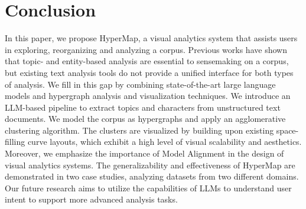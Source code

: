 \section{Conclusion}
In this paper, we propose HyperMap, a visual analytics system that assists users in exploring, reorganizing and analyzing a corpus.
Previous works have shown that topic- and entity-based analysis are essential to sensemaking on a corpus,
but existing text analysis tools do not provide a unified interface for both types of analysis.
We fill in this gap by combining state-of-the-art large language models and hypergraph analysis and visualization techniques.
We introduce an LLM-based pipeline to extract topics and characters from unstructured text documents.
We model the corpus as hypergraphs and apply an agglomerative clustering algorithm.
The clusters are visualized by building upon existing space-filling curve layouts, which exhibit a high level of visual scalability and aesthetics.
Moreover, we emphasize the importance of Model Alignment in the design of visual analytics systems.
The generalizability and effectiveness of HyperMap are demonstrated in two case studies, analyzing datasets from two different domains.
Our future research aims to utilize the capabilities of LLMs to understand user intent to support more advanced analysis tasks.



